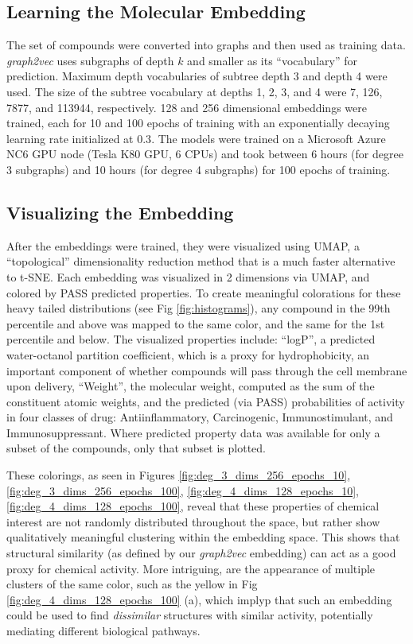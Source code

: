\subsection{Learning the Molecular Embedding}

The set of compounds were converted into graphs and then used as training data. \textit{graph2vec} uses subgraphs of depth $k$ and smaller as its ``vocabulary'' for prediction. Maximum depth vocabularies of subtree depth 3 and depth 4 were used. The size of the subtree vocabulary at depths 1, 2, 3, and 4 were 7, 126, 7877, and 113944, respectively. 128 and 256 dimensional embeddings were trained, each for 10 and 100 epochs of training with an exponentially decaying learning rate initialized at $0.3$. The models were trained on a Microsoft Azure NC6 GPU node (Tesla K80 GPU, 6 CPUs) and took between 6 hours (for degree 3 subgraphs) and 10 hours (for degree 4 subgraphs) for 100 epochs of training.

\subsection{Visualizing the Embedding}

After the embeddings were trained, they were visualized using UMAP, a ``topological'' dimensionality reduction method that is a much faster alternative to t-SNE\cite{McInnes2018}. Each embedding was visualized in 2 dimensions via UMAP, and colored by PASS predicted properties. To create meaningful colorations for these heavy tailed distributions (see Fig \ref{fig:histograms}), any compound in the 99th percentile and above was mapped to the same color, and the same for the 1st percentile and below. The visualized properties include: ``logP'', a predicted water-octanol partition coefficient, which is a proxy for hydrophobicity, an important component of whether compounds will pass through the cell membrane upon delivery, ``Weight'', the molecular weight, computed as the sum of the constituent atomic weights, and the predicted (via PASS) probabilities of activity in four classes of drug: Antiinflammatory, Carcinogenic, Immunostimulant, and Immunosuppressant. Where predicted property data was available for only a subset of the compounds, only that subset is plotted.

These colorings, as seen in Figures \ref{fig:deg_3_dims_256_epochs_10}, \ref{fig:deg_3_dims_256_epochs_100}, \ref{fig:deg_4_dims_128_epochs_10}, \ref{fig:deg_4_dims_128_epochs_100}, reveal that these properties of chemical interest are not randomly distributed throughout the space, but rather show qualitatively meaningful clustering within the embedding space. This shows that structural similarity (as defined by our \textit{graph2vec} embedding) can act as a good proxy for chemical activity. More intriguing, are the appearance of multiple clusters of the same color, such as the yellow in Fig \ref{fig:deg_4_dims_128_epochs_100} (a), which implyp that such an embedding could be used to find \textit{dissimilar} structures with similar activity, potentially mediating different biological pathways.

